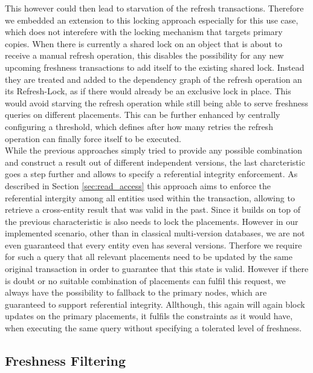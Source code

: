 This however could then lead to starvation of the refresh transactions. 
Therefore we embedded an extension to this locking approach especially for this use case, which does not interefere with 
the locking mechanism that targets primary copies. When there is currently a shared lock on an object that is about to receive a manual refresh operation, 
this disables the possibility for any new upcoming freshness transactions to add itself to the existing shared lock. Instead they are treated and added to the dependency graph 
of the refresh operation an its Refresh-Lock, as if there would already be an exclusive lock in place. 
This would avoid starving the refresh operation while still being able to serve freshness queries on different placements.
This can be further enhanced by centrally configuring a threshold, which defines after how many retries the refresh operation can finally force itself 
to be executed.\\
While the previous approaches simply tried to provide any possible combination
and construct a result out of different independent versions, the last charcteristic goes a step further and allows to specify a referential integrity enforcement. 
As described in Section \ref{sec:read_access} this approach aims to enforce the referential intergity among all entities used within the transaction, 
allowing to retrieve a cross-entity result that was valid in the past. Since it builds on top of the previous characteristic is also needs to lock the placements. 
However in our implemented scenario, other than in classical multi-version databases, we are not even guaranteed that every entity even has several versions. 
Therfore we require for such a query that all relevant placements need to be updated by the same original transaction in order to guarantee that this state is valid.
However if there is doubt or no suitable combination of placements can fulfil this request,
we always have the possibility to fallback to the primary nodes, which are guaranteed to support referential integrity.
Allthough, this again will again block updates on the primary placements, it fulfils the constraints as it would have, when executing the same query without specifying a tolerated level of freshness.






\subsection{Freshness Filtering}
\label{sec:fresh_filter} 

